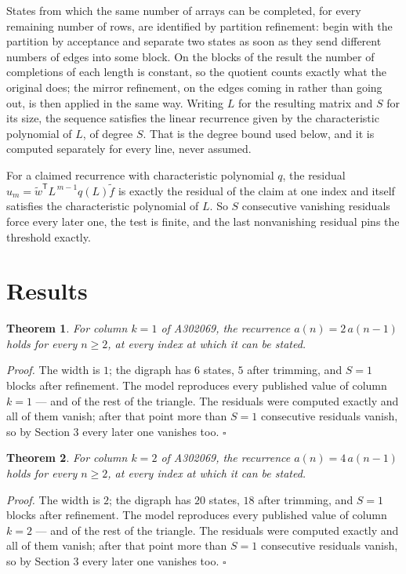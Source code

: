 \documentclass[11pt]{article}
\newtheorem{theorem}{Theorem}
\theoremstyle{definition}
\begin{document}
States from which the same number of arrays can be completed, for every remaining number of rows, are identified by partition refinement: begin with the partition by acceptance and separate two states as soon as they send different numbers of edges into some block. On the blocks of the result the number of completions of each length is constant, so the quotient counts exactly what the original does; the mirror refinement, on the edges coming in rather than going out, is then applied in the same way. Writing $L$ for the resulting matrix and $S$ for its size, the sequence satisfies the linear recurrence given by the characteristic polynomial of $L$, of degree $S$. That is the degree bound used below, and it is computed separately for every line, never assumed.

For a claimed recurrence with characteristic polynomial $q$, the residual $u_m = \tilde w^{\mathsf T}L^{\,m-1}q(L)\tilde f$ is exactly the residual of the claim at one index and itself satisfies the characteristic polynomial of $L$. So $S$ consecutive vanishing residuals force every later one, the test is finite, and the last nonvanishing residual pins the threshold exactly.

\section{Results}

\begin{theorem} For column $k = 1$ of A302069, the recurrence $a(n) = 2\,a(n-1)$ holds for every $n \ge 2$, at every index at which it can be stated.\end{theorem}

{\itshape Proof.} The width is $1$; the digraph has $6$ states, $5$ after trimming, and $S = 1$ blocks after refinement. The model reproduces every published value of column $k = 1$ --- and of the rest of the triangle. The residuals were computed exactly and all of them vanish; after that point more than $S = 1$ consecutive residuals vanish, so by Section 3 every later one vanishes too. $\square$

\begin{theorem} For column $k = 2$ of A302069, the recurrence $a(n) = 4\,a(n-1)$ holds for every $n \ge 2$, at every index at which it can be stated.\end{theorem}

{\itshape Proof.} The width is $2$; the digraph has $20$ states, $18$ after trimming, and $S = 1$ blocks after refinement. The model reproduces every published value of column $k = 2$ --- and of the rest of the triangle. The residuals were computed exactly and all of them vanish; after that point more than $S = 1$ consecutive residuals vanish, so by Section 3 every later one vanishes too. $\square$
\end{document}
